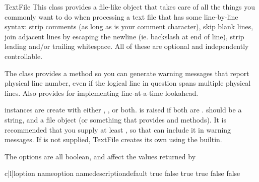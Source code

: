 \documentclass{manual}
\begin{document}
\begin{classdesc}{TextFile}{}
This class provides a file-like object that takes care of all 
the things you commonly want to do when processing a text file 
that has some line-by-line syntax: strip comments (as long as \code{\#} 
is your comment character), skip blank lines, join adjacent lines by
escaping the newline (ie. backslash at end of line), strip
leading and/or trailing whitespace.  All of these are optional
and independently controllable.

The class provides a  method so you can generate 
warning messages that report physical line number, even if the 
logical line in question spans multiple physical lines.  Also 
provides  for implementing line-at-a-time lookahead.

 instances are create with either , ,
or both.  is raised if both are .
 should be a string, and  a file object (or
something that provides  and  
methods).  It is recommended that you supply at least , 
so that  can include it in warning messages.  If 
 is not supplied, TextFile creates its own using the 
 builtin.

The options are all boolean, and affect the values returned by

\begin{tableiii}{c|l|l}{option name}{option name}{description}{default}
{true}
{false}
{true}
{true}
{false}
{false}
\end{tableiii}


\end{classdesc}
\end{document}
